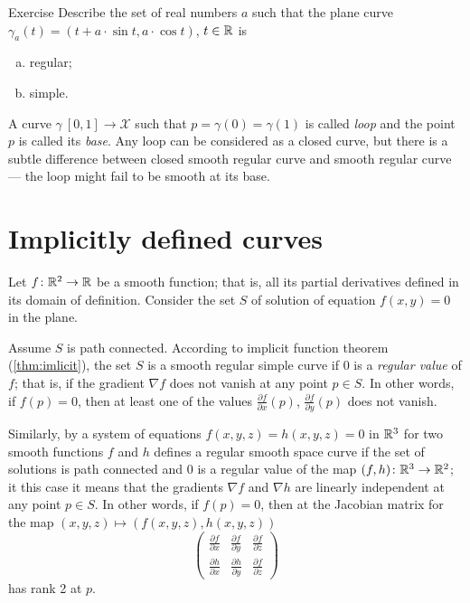 \begin{thm}{Exercise}\label{ex:cycloid}
Describe the set of real numbers $a$
such that the plane curve $\gamma_a(t)= (t+a\cdot \sin t,a\cdot \cos t)$, $t\in\mathbb{R}$ is
\begin{enumerate}[(a)]
\item regular;
\item simple.
\end{enumerate}

\end{thm}

A curve $\gamma\:[0,1]\to \mathcal{X}$ such that $p=\gamma(0)=\gamma(1)$ is called \emph{loop} and the point $p$ is called its \emph{base}.
Any loop can be considered as a closed curve, but there is a subtle difference between closed smooth regular curve and smooth regular curve --- the loop might fail to be smooth at its base.


\section*{Implicitly defined curves}

Let $f\colon\mathbb{R}^2\to \mathbb{R}$ be a smooth function; 
that is, all its partial derivatives defined in its domain of definition.
Consider the set $S$ of solution of equation $f(x,y)=0$ in the plane.

Assume $S$ is path connected.
According to implicit function theorem (\ref{thm:imlicit}), the set $S$ is a smooth regular simple curve if $0$ is a \emph{regular value} of $f$;
that is, if the gradient $\nabla f$ does not vanish at any point $p\in S$.
In other words, if $f(p)=0$, then at least one of the values $\tfrac{\partial f}{\partial x}(p)$, $\tfrac{\partial f}{\partial y}(p)$ does not vanish.

Similarly, by a system of equations
$f(x,y,z)=h(x,y,z)=0$ in $\mathbb{R}^3$ for two smooth functions $f$ and $h$
defines a regular smooth space curve if the set of solutions is path connected and $0$ is a regular value of the map $(f,h)\colon\mathbb{R}^3\to\mathbb{R}^2$;
it this case it means that the gradients $\nabla f$ and $\nabla h$ are linearly independent at any point $p\in S$.
In other words, if $f(p)=0$, then at the Jacobian matrix for the map $(x,y,z)\mapsto (f(x,y,z),h(x,y,z))$
\[
\begin{pmatrix}
\tfrac{\partial f}{\partial x}&\tfrac{\partial f}{\partial y}&\tfrac{\partial f}{\partial z}\\
\tfrac{\partial h}{\partial x}&\tfrac{\partial h}{\partial y}&\tfrac{\partial f}{\partial z}
\end{pmatrix}
\]
has rank 2 at $p$.

